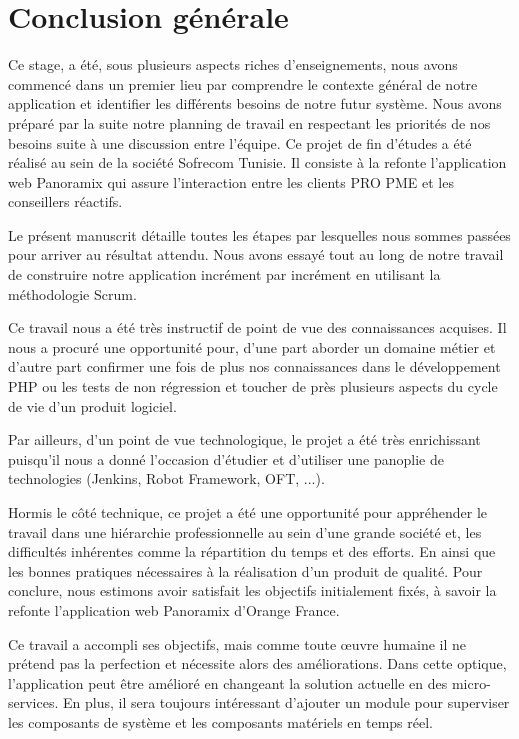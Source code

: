 \chapter*{Conclusion générale}

Ce stage, a été, sous plusieurs aspects riches d'enseignements, nous avons commencé dans un premier lieu par comprendre le contexte général de notre application et identifier les différents besoins de notre futur système. Nous avons préparé par la suite notre planning de travail en respectant les priorités de nos besoins suite à une discussion entre l'équipe. Ce projet de fin d'études a été réalisé au sein de la société Sofrecom Tunisie. Il consiste à la refonte l'application web Panoramix qui assure l'interaction entre les clients PRO PME et les conseillers réactifs.\\\newline

Le présent manuscrit détaille toutes les étapes par lesquelles nous sommes passées pour arriver au résultat attendu. Nous avons essayé tout au long de notre travail de construire notre application incrément par incrément en utilisant la méthodologie Scrum.\\\newline

Ce travail nous a été très instructif de point de vue des connaissances acquises. Il nous a procuré une opportunité pour, d'une part aborder un domaine métier et d'autre part confirmer une fois de plus nos connaissances dans le développement PHP ou les tests de non régression et toucher de près plusieurs aspects du cycle de vie d'un produit logiciel.\\\newline

Par ailleurs, d'un point de vue technologique, le projet a été très enrichissant puisqu'il nous a donné l'occasion d'étudier et d'utiliser une panoplie de technologies (Jenkins, Robot Framework, OFT, ...).\\\newline

Hormis le côté technique, ce projet a été une opportunité pour appréhender le travail dans une hiérarchie professionnelle au sein d'une grande société et, les difficultés inhérentes comme la répartition du temps et des efforts. En ainsi que les bonnes pratiques nécessaires à la réalisation d'un produit de qualité. Pour conclure, nous estimons avoir satisfait les objectifs initialement fixés, à savoir la refonte l'application web Panoramix d'Orange France.\\\newline

Ce travail a accompli ses objectifs, mais comme toute œuvre humaine il ne prétend pas la perfection et nécessite alors des améliorations. Dans cette optique, l'application peut être amélioré en changeant la solution actuelle en des micro-services. En plus, il sera toujours intéressant d'ajouter un module pour superviser les composants de système et les composants matériels en temps réel.\\